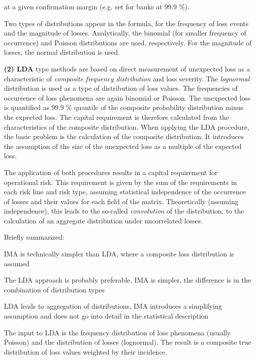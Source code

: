 \documentclass{article}
\begin{document}
at a given confirmation margin (e.g. set for banks at 99.9 \%).

Two types of distributions appear in the formula, for the frequency of loss events and the magnitude of losses. Analytically, the binomial (for smaller frequency of occurrence) and Poisson distributions are used, respectively.  For the magnitude of losses, the normal distribution is used.

\textbf{(2) LDA} type methods are based on direct measurement of unexpected loss as a characteristic of \emph{composite frequency distribution} and loss severity. The \emph{lognormal} distribution is used as a type of distribution of loss values. The frequencies of occurrence of loss phenomena are again binomial or Poisson. The unexpected loss is quantified as 99.9 \% quantile of the composite probability distribution minus the expected loss. The capital requirement is therefore calculated from the characteristics of the composite distribution. When applying the LDA procedure, the basic problem is the calculation of the composite distribution. It introduces the assumption of the size of the unexpected loss as a multiple of the expected loss.

The application of both procedures results in a capital requirement for operational risk. This requirement is given by the sum of the requirements in each risk line and risk type, assuming statistical independence of the occurrence of losses and their values for each field of the matrix. Theoretically (assuming independence), this leads to the so-called \emph{convolution} of the distribution, to the calculation of an aggregate distribution under uncorrelated losses.

Briefly summarized:
\begin{compactitem}
    \item IMA is technically simpler than LDA, where a composite loss distribution is assumed
    \item The LDA approach is probably preferable, IMA is simpler, the difference is in the combination of distribution types
    \item LDA leads to aggregation of distributions, IMA introduces a simplifying assumption and does not go into detail in the statistical description
    \item The input to LDA is the frequency distribution of loss phenomena (usually Poisson) and the distribution of losses (lognormal). The result is a composite true distribution of loss values weighted by their incidence.
\end{compactitem}
\end{document}
